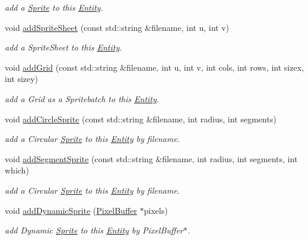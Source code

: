 \begin{DoxyCompactItemize}
\begin{DoxyCompactList}\small\item\em add a \hyperlink{class_sprite}{Sprite} to this \hyperlink{class_entity}{Entity}. \end{DoxyCompactList}\item 
void \hyperlink{class_entity_a733aebaa5220f6dbd9b147aa8a9f6a3c}{add\+Sprite\+Sheet} (const std\+::string \&filename, int u, int v)
\begin{DoxyCompactList}\small\item\em add a Sprite\+Sheet to this \hyperlink{class_entity}{Entity}. \end{DoxyCompactList}\item 
void \hyperlink{class_entity_a3974e092fbb0f5984bf6806f83b62e33}{add\+Grid} (const std\+::string \&filename, int u, int v, int cols, int rows, int sizex, int sizey)
\begin{DoxyCompactList}\small\item\em add a Grid as a Spritebatch to this \hyperlink{class_entity}{Entity}. \end{DoxyCompactList}\item 
void \hyperlink{class_entity_a5a45a17006bcba507ffeeb33ddd6269e}{add\+Circle\+Sprite} (const std\+::string \&filename, int radius, int segments)
\begin{DoxyCompactList}\small\item\em add a Circular \hyperlink{class_sprite}{Sprite} to this \hyperlink{class_entity}{Entity} by filename. \end{DoxyCompactList}\item 
void \hyperlink{class_entity_a30b6c9e7d43616a622efa168b0b143e1}{add\+Segment\+Sprite} (const std\+::string \&filename, int radius, int segments, int which)
\begin{DoxyCompactList}\small\item\em add a Circular \hyperlink{class_sprite}{Sprite} to this \hyperlink{class_entity}{Entity} by filename. \end{DoxyCompactList}\item 
void \hyperlink{class_entity_adefc8fe3904ba419ac580c6aab09d770}{add\+Dynamic\+Sprite} (\hyperlink{struct_pixel_buffer}{Pixel\+Buffer} $\ast$pixels)
\begin{DoxyCompactList}\small\item\em add Dynamic \hyperlink{class_sprite}{Sprite} to this \hyperlink{class_entity}{Entity} by Pixel\+Buffer$\ast$. \end{DoxyCompactList}\item 

\end{DoxyCompactItemize}
